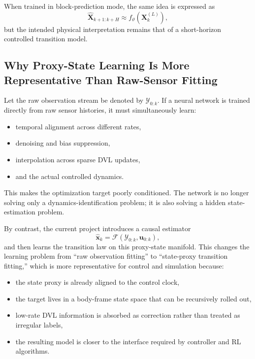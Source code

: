 When trained in block-prediction mode, the same idea is expressed as
\begin{equation}
\hat{\mathbf{X}}_{k+1:k+H}
\approx
f_{\vartheta}\!\left(\mathbf{X}^{(L)}_{k}\right),
\end{equation}
but the intended physical interpretation remains that of a short-horizon controlled transition model.

\subsection{Why Proxy-State Learning Is More Representative Than Raw-Sensor Fitting}

Let the raw observation stream be denoted by $\mathcal{Y}_{0:k}$.
If a neural network is trained directly from raw sensor histories, it must simultaneously learn:
\begin{itemize}
  \item temporal alignment across different rates,
  \item denoising and bias suppression,
  \item interpolation across sparse DVL updates,
  \item and the actual controlled dynamics.
\end{itemize}

This makes the optimization target poorly conditioned.
The network is no longer solving only a dynamics-identification problem; it is also solving a hidden state-estimation problem.

By contrast, the current project introduces a causal estimator
\begin{equation}
\hat{\mathbf{x}}_k = \mathcal{F}(\mathcal{Y}_{0:k}, \mathbf{u}_{0:k}),
\end{equation}
and then learns the transition law on this proxy-state manifold.
This changes the learning problem from ``raw observation fitting'' to ``state-proxy transition fitting,''
which is more representative for control and simulation because:
\begin{itemize}
  \item the state proxy is already aligned to the control clock,
  \item the target lives in a body-frame state space that can be recursively rolled out,
  \item low-rate DVL information is absorbed as correction rather than treated as irregular labels,
  \item the resulting model is closer to the interface required by controller and RL algorithms.
\end{itemize}

